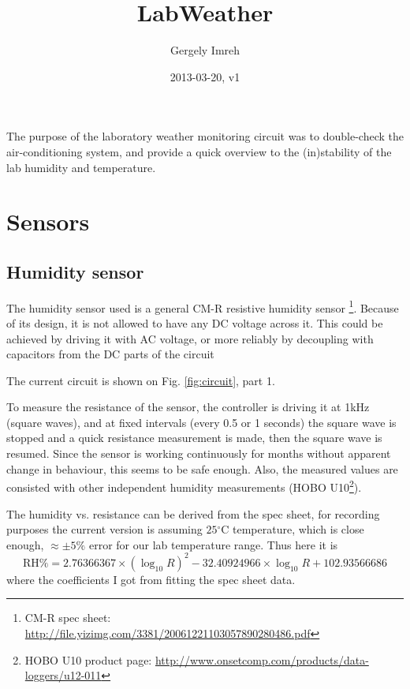 \documentclass[12pt,a4paper]{article}
\author{Gergely Imreh}
\title{LabWeather}
\date{2013-03-20, v1}
\begin{document}
\maketitle

The purpose of the laboratory weather monitoring circuit was to double-check the air-conditioning system, and provide a quick overview to the (in)stability of the lab humidity and temperature.

\tableofcontents

\section{Sensors}

\subsection{Humidity sensor}

The humidity sensor used is a general CM-R resistive humidity sensor \footnote{CM-R spec sheet: \url{http://file.yizimg.com/3381/20061221103057890280486.pdf}}. Because of its design, it is not allowed to have any DC voltage across it. This could be achieved by driving it with AC voltage, or more reliably by decoupling with capacitors from the DC parts of the circuit

The current circuit is shown on Fig. \ref{fig:circuit}, part 1.

To measure the resistance of the sensor, the controller is driving it at 1kHz (square waves), and at fixed intervals (every 0.5 or 1 seconds) the square wave is stopped and a quick resistance measurement is made, then the square wave is resumed. Since the sensor is working continuously for months without apparent change in behaviour, this seems to be safe enough. Also, the measured values are consisted with other independent humidity measurements (HOBO U10\footnote{HOBO U10 product page: \url{http://www.onsetcomp.com/products/data-loggers/u12-011}}).

The humidity vs. resistance can be derived from the spec sheet, for recording purposes the current version is assuming $25\mathrm{^\circ C}$ temperature, which is close enough, $\approx \pm 5 \% $ error for our lab temperature range. Thus here it is
\begin{equation}
\mathrm{RH\%} =  2.76366367 \times (\log_{10} R) ^ 2 - 32.40924966 \times \log_{10}R + 102.93566686
\end{equation}
where the coefficients I got from fitting the spec sheet data.
\end{document}
